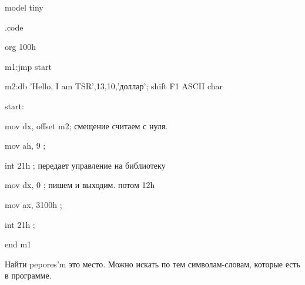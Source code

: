 model tiny

.code

org 100h

m1:jmp start

m2:db 'Hello, I am TSR',13,10,'доллар'; shift F1 ASCII char

start: 

mov dx, offset m2; смещение считаем с нуля. 

mov ah, 9        ;

int 21h          ; передает управление на библиотеку

mov dx, 0        ; пишем и выходим. потом 12h

mov ax, 3100h    ;

int 21h          ;

end m1

\begin{hw}Найти pepores'm это место. Можно искать по тем символам-словам, которые есть в программе.\end{hw} 